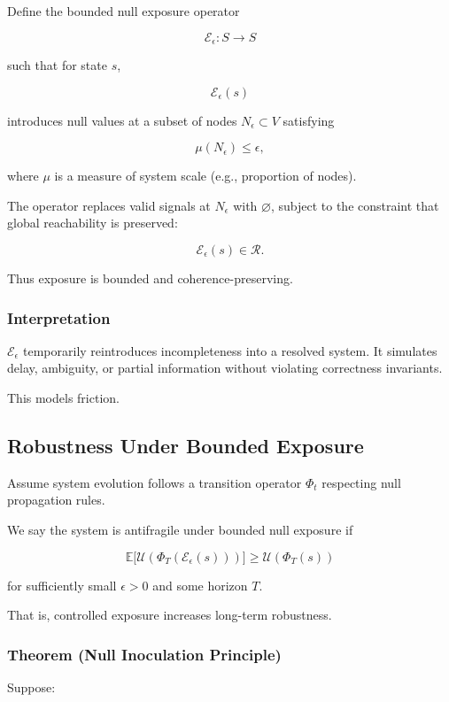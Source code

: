 \documentclass[12pt]{article}
\begin{document}
Define the bounded null exposure operator

\[
\mathcal{E}_\epsilon : S \to S
\]

such that for state $s$,

\[
\mathcal{E}_\epsilon(s)
\]

introduces null values at a subset of nodes $N_\epsilon \subset V$ satisfying

\[
\mu(N_\epsilon) \le \epsilon,
\]

where $\mu$ is a measure of system scale (e.g., proportion of nodes).

The operator replaces valid signals at $N_\epsilon$ with $\varnothing$, subject to the constraint that global reachability is preserved:

\[
\mathcal{E}_\epsilon(s) \in \mathcal{R}.
\]

Thus exposure is bounded and coherence-preserving.

\subsubsection*{Interpretation}

$\mathcal{E}_\epsilon$ temporarily reintroduces incompleteness into a resolved system. It simulates delay, ambiguity, or partial information without violating correctness invariants.

This models friction.

\subsection{Robustness Under Bounded Exposure}

Assume system evolution follows a transition operator $\Phi_t$ respecting null propagation rules.

We say the system is antifragile under bounded null exposure if

\[
\mathbb{E}\big[\mathcal{U}(\Phi_T(\mathcal{E}_\epsilon(s)))\big]
\ge
\mathcal{U}(\Phi_T(s))
\]

for sufficiently small $\epsilon > 0$ and some horizon $T$.

That is, controlled exposure increases long-term robustness.

\subsubsection*{Theorem (Null Inoculation Principle)}

Suppose:
\end{document}
